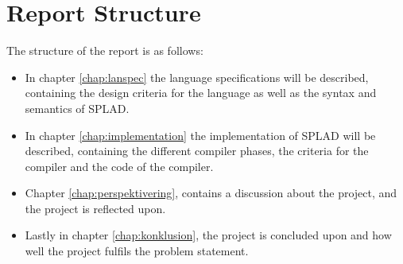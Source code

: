 \section{Report Structure}
The structure of the report is as follows:
\begin{itemize}
	\item In chapter \ref{chap:lanspec} the language specifications will be described, containing the design criteria for the language as well as the syntax and semantics of SPLAD.
	\item In chapter \ref{chap:implementation} the implementation of SPLAD will be described, containing the different compiler phases, the criteria for the compiler and the code of the compiler.
	\item Chapter \ref{chap:perspektivering}, contains a discussion about the project, and the project is reflected upon. 
	\item Lastly in chapter \ref{chap:konklusion}, the project is concluded upon and how well the project fulfils the problem statement.
\end{itemize}
